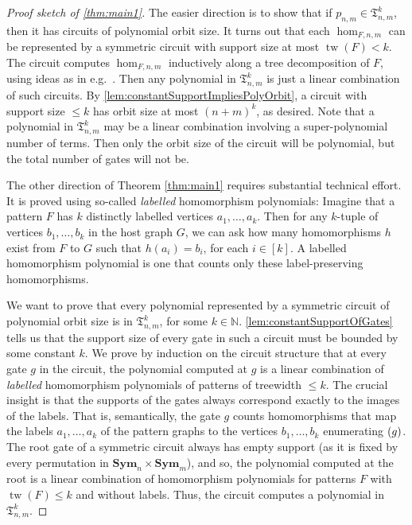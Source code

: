 \documentclass[10pt,a4paper]{article}
\theoremstyle{definition}
\theoremstyle{plain}
\theoremstyle{remark}
\DeclareMathOperator{\tw}{tw}
\newcommand{\Sym}{\mathbf{Sym}}
\newcommand{\bbN}{\mathbb{N}}
\let\sup\relax
\DeclareMathOperator{\sup}{sup}
\begin{document}
\begin{proof}[Proof sketch of \cref{thm:main1}]
The easier direction is to show that if $p_{n,m} \in \mathfrak{T}_{n,m}^k$, then it has circuits of polynomial orbit size.
It turns out that each $\hom_{F, n, m}$ can be represented by a symmetric circuit with support size at most $\tw(F) < k$. 
The circuit computes $\hom_{F, n, m}$ inductively along a tree decomposition of $F$, using ideas as in e.g.\ \cite{dvorak_recognizing_2010}. 
Then any polynomial in $\mathfrak{T}_{n,m}^k$ is just a linear combination of such circuits.
By \cref{lem:constantSupportImpliesPolyOrbit}, a circuit with support size $\leq k$ has orbit size at most $(n+m)^k$, as desired. Note that a polynomial in $\mathfrak{T}_{n,m}^k$ may be a linear combination involving a super-polynomial number of terms. Then only the orbit size of the circuit will be polynomial, but the total number of gates will not be.

The other direction of Theorem \ref{thm:main1} requires substantial technical effort. It is proved using so-called \emph{labelled} homomorphism polynomials: Imagine that a pattern $F$ has $k$ distinctly labelled vertices $a_1, \dots, a_k$. Then for any $k$-tuple of vertices $b_1, \dots, b_k$ in the host graph $G$, we can ask how many homomorphisms $h$ exist from $F$ to $G$ such that $h(a_i) = b_i$, for each $i \in [k]$. A labelled homomorphism polynomial is one that counts only these label-preserving homomorphisms. 

We want to prove that every polynomial represented by a symmetric circuit of polynomial orbit size is in $\mathfrak{T}_{n,m}^k$, for some $k \in \bbN$.
\cref{lem:constantSupportOfGates} tells us that the support size of every gate in such a circuit must be bounded by some constant $k$. We prove by induction on the circuit structure that at every gate $g$ in the circuit, the polynomial computed at $g$ is a linear combination of \emph{labelled} homomorphism polynomials of patterns of treewidth $\leq k$.
The crucial insight is that the supports of the gates always correspond exactly to the images of the labels. That is, semantically, the gate $g$ counts homomorphisms that map the labels $a_1, \dots, a_k$ of the pattern graphs to the vertices
$b_1, \dots, b_k$ enumerating $\sup(g)$.
The root gate of a symmetric circuit always has empty support (as it is fixed by every permutation in $\Sym_n \times \Sym_m$), and so, the polynomial computed at the root is a linear combination of homomorphism polynomials for patterns $F$ with $\tw(F) \leq k$ and without labels. Thus, the circuit computes a polynomial in $\mathfrak{T}_{n,m}^k$.
\end{proof}
\end{document}
